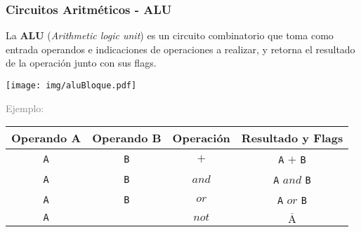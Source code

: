 \documentclass[aspectratio=169]{beamer}
\begin{document}
\begin{frame}[fragile,t]
    \frametitle{Circuitos Aritméticos - ALU}
    La \textbf{ALU} (\textit{Arithmetic logic unit}) es un circuito combinatorio que toma como entrada operandos e indicaciones de operaciones a realizar, y retorna el resultado de la operación junto con sus flags.
    \vspace{0.2cm}
    \pause
    \begin{center}
    \texttt{[image: img/aluBloque.pdf]}
    \end{center}
    \pause
    \vspace{-0.7cm}
    \textcolor{gray}{Ejemplo:}
    \begin{center}
    \begin{tabular}{|c|c|c|c|} \hline
    \rowcolor{gray!30} Operando A & Operando B & Operación & Resultado y Flags \\ \hline
    \texttt{A} & \texttt{B} & $+$ & \texttt{A} $+$ \texttt{B} \\ \hline
    \texttt{A} & \texttt{B} & $and$ & \texttt{A} $and$ \texttt{B} \\ \hline
    \texttt{A} & \texttt{B} & $or$ & \texttt{A} $or$ \texttt{B} \\ \hline
    \texttt{A} & \texttt{}  & $not$ & $\overline{\text{A}}$ \\ \hline
    \end{tabular}
    \end{center}
\end{frame}
\end{document}
